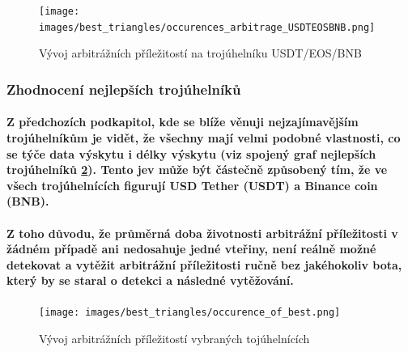\documentclass[thesis=B,czech]{FITthesis}[2019/03/21]
\begin{document}
\begin{figure}\centering
	\texttt{[image: images/best\_triangles/occurences\_arbitrage\_USDTEOSBNB.png]}
	\caption{Vývoj arbitrážních příležitostí na trojúhelníku USDT/EOS/BNB }\label{occurences_arbitrage_USDTEOSBNB}
\end{figure}
\subsubsection{Zhodnocení nejlepších trojúhelníků}
\paragraph{
Z předchozích podkapitol, kde se blíže věnuji nejzajímavějším trojúhelníkům je vidět, že všechny mají velmi podobné vlastnosti, co se týče data výskytu i délky výskytu (viz spojený graf nejlepších trojúhelníků \ref{occurence_of_best}). Tento jev může být částečně způsobený tím, že ve všech trojúhelnících figurují USD Tether (USDT) a Binance coin (BNB). 
}
\paragraph{
Z toho důvodu, že průměrná doba životnosti arbitrážní příležitosti v žádném případě ani nedosahuje jedné vteřiny, není reálně možné detekovat a vytěžit arbitrážní příležitosti ručně bez jakéhokoliv bota, který by se staral o detekci a následné vytěžování. 
}

\begin{figure}\centering
	\texttt{[image: images/best\_triangles/occurence\_of\_best.png]}
	\caption{Vývoj arbitrážních příležitostí vybraných tojúhelnících }\label{occurence_of_best}
\end{figure}
\end{document}
